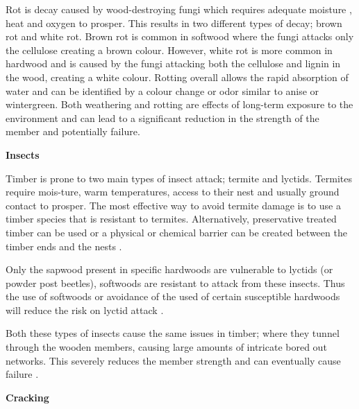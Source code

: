 \documentclass[11pt,a4paper]{article}
\numberwithin{equation}{subsection}
\begin{document}
	\noindent
	Rot is decay caused by wood-destroying fungi which requires adequate moisture \cite{heckroodt_guide_2002}, heat and oxygen to prosper. This results in two different types of decay; brown rot and white rot. Brown rot is common in softwood where the fungi attacks only the cellulose creating a brown colour. However, white rot is more common in hardwood and is caused by the fungi attacking both the cellulose and lignin in the wood, creating a white colour. Rotting overall allows the rapid absorption of water and can be identified by a colour change or odor similar to anise or wintergreen\cite{white_bridge_1992}. Both weathering and rotting are effects of long-term exposure to the environment and can lead to a significant reduction in the strength of the member and potentially failure.
	
    \vspace*{\baselineskip}
	    
    \noindent
    \textbf{Insects}\par
    \noindent
    Timber is prone to two main types of insect attack; termite and lyctids. Termites require mois-ture, warm temperatures, access to their nest and usually ground contact to prosper. The most effective way to avoid termite damage is to use a timber species that is resistant to termites. Alternatively, preservative treated timber can be used or a physical or chemical barrier can be created between the timber ends and the nests \cite{_section_2008}.
	
	\vspace*{\baselineskip}
	
	\noindent
	Only the sapwood present in specific hardwoods are vulnerable to lyctids (or powder post beetles), softwoods are resistant to attack from these insects. Thus the use of softwoods or avoidance of the used of certain susceptible hardwoods will reduce the risk on lyctid attack \cite{_section_2008}.
	
	 \vspace*{\baselineskip}
	 
	\noindent
	Both these types of insects cause the same issues in timber; where they tunnel through the wooden members, causing large amounts of intricate bored out networks. This severely reduces the member strength and can eventually cause failure \cite{ryall_bridge_2001}.

	
    \vspace*{\baselineskip}
    
    \noindent
    \textbf{Cracking}
    
\end{document}
